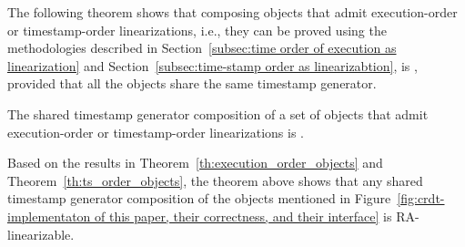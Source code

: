 The following theorem shows that composing \crdtlinearizable{} objects that admit execution-order or timestamp-order linearizations, i.e., they can be proved \crdtlinearizable{} using the methodologies described in Section~\ref{subsec:time order of execution as linearization} and Section~\ref{subsec:time-stamp order as linearizabtion}, is \crdtlinearizable{}, provided that all the objects share the same timestamp generator.

\begin{theorem}\label{th:comp_all}
The shared timestamp generator composition of a set of \crdtlinearizable{} objects that admit execution-order or timestamp-order linearizations is \crdtlinearizable{}.
\end{theorem}

Based on the results in Theorem~\ref{th:execution_order_objects} and Theorem~\ref{th:ts_order_objects}, the theorem above shows that any shared timestamp generator composition of the objects mentioned in Figure~\ref{fig:crdt-implementaton of this paper, their correctness, and their interface} is RA-linearizable.

% 


